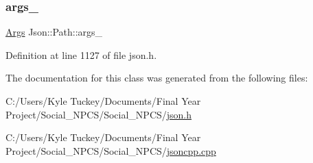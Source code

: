 \subsubsection{\texorpdfstring{args\+\_\+}{args\_}}
{\footnotesize\ttfamily \hyperlink{class_json_1_1_path_a27d96232d034d7a78286468676f9cb3e}{Args} Json\+::\+Path\+::args\+\_\+\hspace{0.3cm}{\ttfamily [private]}}



Definition at line 1127 of file json.\+h.



The documentation for this class was generated from the following files\+:\begin{DoxyCompactItemize}
\item 
C\+:/\+Users/\+Kyle Tuckey/\+Documents/\+Final Year Project/\+Social\+\_\+\+N\+P\+C\+S/\+Social\+\_\+\+N\+P\+C\+S/\hyperlink{json_8h}{json.\+h}\item 
C\+:/\+Users/\+Kyle Tuckey/\+Documents/\+Final Year Project/\+Social\+\_\+\+N\+P\+C\+S/\+Social\+\_\+\+N\+P\+C\+S/\hyperlink{jsoncpp_8cpp}{jsoncpp.\+cpp}\end{DoxyCompactItemize}
